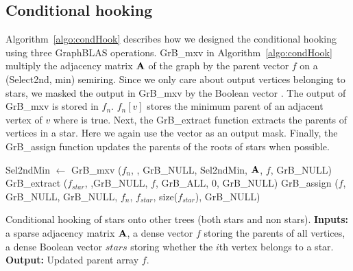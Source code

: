 \subsection{Conditional hooking}
Algorithm~\ref{algo:condHook} describes how we designed the conditional hooking using three GraphBLAS operations.
GrB\_mxv in  Algorithm~\ref{algo:condHook} multiply the adjacency matrix $\mathbf{A}$ of the graph by the parent vector $f$ on a (Select2nd, min) semiring. Since we only care about output vertices belonging to stars, we masked the output in GrB\_mxv by the Boolean vector .
The output of GrB\_mxv is stored in $f_n$.  $f_n[v]$ stores the minimum parent of an adjacent vertex of $v$ where  is true.  
Next, the GrB\_extract function extracts the parents of vertices in a star. Here we again use the  vector as an output mask.
Finally, the GrB\_assign function updates the parents of the roots of stars when possible.

\begin{algorithm}[htbp]
\begin{algorithmic}[1]
\begin{small}
	\State Sel2ndMin $\gets$ 
	\State GrB\_mxv ($f_n$, ,  GrB\_NULL,  Sel2ndMin,  $\mathbf{A}$,  $f$, GrB\_NULL) \li
	\State GrB\_extract ($f_{star}$, ,GrB\_NULL,  $f$,  GrB\_ALL, 0, GrB\_NULL) 
	\State GrB\_assign ($f$, GrB\_NULL,  GrB\_NULL,  $f_n$,  $f_{star}$,  size($f_{star}$), GrB\_NULL) 

 \EndProcedure
\end{small}
\end{algorithmic}
\caption{Conditional hooking of stars onto other trees (both stars and non stars).  {\bf Inputs:} a sparse adjacency matrix $\mathbf{A}$, a dense vector $f$ storing the parents of all vertices, a dense Boolean vector $stars$ storing whether the $i$th vertex belongs to a star.
{\bf Output:} Updated parent array $f$.}
\label{algo:condHook}
\end{algorithm}

